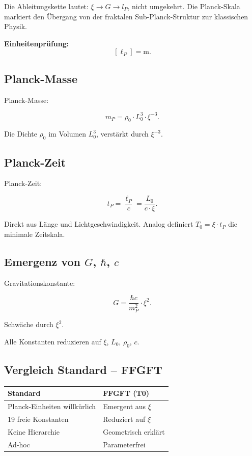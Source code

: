 	Die Ableitungskette lautet: \(\xi \to G \to l_P\), nicht umgekehrt. Die Planck-Skala markiert den Übergang von der fraktalen Sub-Planck-Struktur zur klassischen Physik.
	
	\textbf{Einheitenprüfung:}
	\[
	[\ell_P] = \si{\meter}.
	\]
	
	\subsection*{Planck-Masse}
	
	Planck-Masse:
	
	\begin{equation}
		m_P = \rho_0 \cdot L_0^3 \cdot \xi^{-3}.
	\end{equation}
	
	Die Dichte \(\rho_0\) im Volumen \(L_0^3\), verstärkt durch \(\xi^{-3}\).
	
	\subsection*{Planck-Zeit}
	
	Planck-Zeit:
	
	\begin{equation}
		t_P = \frac{\ell_P}{c} = \frac{L_0}{c \cdot \xi}.
	\end{equation}
	
	Direkt aus Länge und Lichtgeschwindigkeit. Analog definiert \(T_0 = \xi \cdot t_P\) die minimale Zeitskala.
	
	\subsection*{Emergenz von \(G\), \(\hbar\), \(c\)}
	
	Gravitationskonstante:
	
	\begin{equation}
		G = \frac{\hbar c}{m_P^2} \cdot \xi^2.
	\end{equation}
	
	Schwäche durch \(\xi^2\).
	
	Alle Konstanten reduzieren auf \(\xi\), \(L_0\), \(\rho_0\), \(c\).
	
	\subsection*{Vergleich Standard -- FFGFT}
	
	\begin{center}
		\begin{tabular}{p{}p{}}
			\textbf{Standard} & \textbf{FFGFT (T0)} \\
			\hline
			Planck-Einheiten willkürlich & Emergent aus \(\xi\) \\
			19 freie Konstanten & Reduziert auf \(\xi\) \\
			Keine Hierarchie & Geometrisch erklärt \\
			Ad-hoc & Parameterfrei \\
		\end{tabular}
	\end{center}
	
